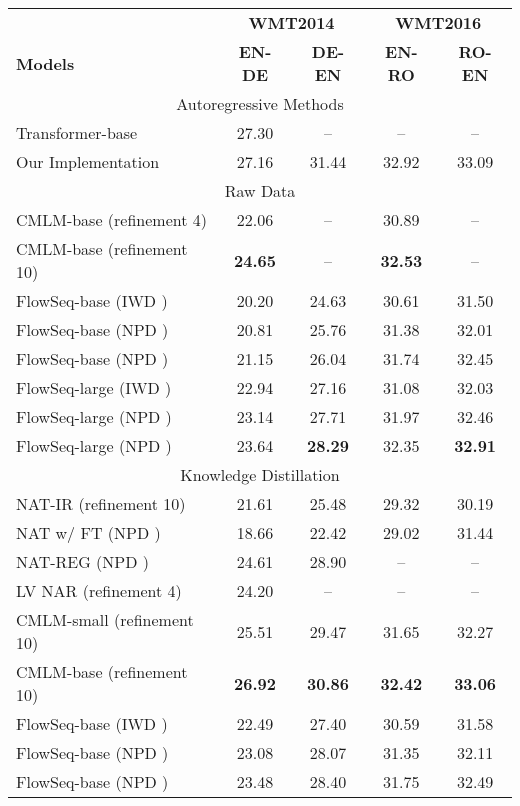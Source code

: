\documentclass[11pt,a4paper]{article}
\begin{document}
\begin{table}[t]
\centering
\resizebox{1.0\columnwidth}{!}
{\begin{tabular}{lcccc}
\toprule
 & \multicolumn{2}{c}{\textbf{WMT2014}} & \multicolumn{2}{c}{\textbf{WMT2016}} \\
\textbf{ Models} & \textbf{EN-DE} & \textbf{DE-EN} & \textbf{EN-RO} & \textbf{RO-EN} \\
\midrule\midrule
\multicolumn{5}{c}{Autoregressive Methods} \\
\midrule
Transformer-base & 27.30 &  -- &  -- & -- \\
Our Implementation & 27.16 & 31.44 & 32.92 & 33.09 \\
\midrule\midrule
\multicolumn{5}{c}{Raw Data} \\
\midrule
CMLM-base (refinement 4) & 22.06 & -- & 30.89 & -- \\
CMLM-base (refinement 10) & \textbf{24.65} & -- & \textbf{32.53} & -- \\
\midrule
FlowSeq-base (IWD ) & 20.20 & 24.63 & 30.61 & 31.50 \\
FlowSeq-base (NPD ) & 20.81 & 25.76 & 31.38 & 32.01 \\
FlowSeq-base (NPD ) & 21.15 & 26.04 & 31.74 & 32.45 \\
\hdashline
FlowSeq-large (IWD ) & 22.94 & 27.16 & 31.08 & 32.03 \\
FlowSeq-large (NPD ) & 23.14 & 27.71 & 31.97 & 32.46 \\
FlowSeq-large (NPD ) & 23.64 & \textbf{28.29} & 32.35 & \textbf{32.91} \\
\midrule\midrule
\multicolumn{5}{c}{Knowledge Distillation} \\ 
\midrule
NAT-IR (refinement 10) & 21.61 &  25.48 & 29.32 & 30.19 \\
NAT w/ FT (NPD ) & 18.66 & 22.42 & 29.02 & 31.44 \\
NAT-REG (NPD ) & 24.61 & 28.90 & -- & -- \\
LV NAR (refinement 4) & 24.20 & -- & -- & -- \\
CMLM-small (refinement 10) & 25.51 & 29.47 & 31.65 & 32.27 \\
CMLM-base (refinement 10) & \textbf{26.92} & \textbf{30.86} & \textbf{32.42} & \textbf{33.06} \\
\midrule
FlowSeq-base (IWD ) & 22.49 & 27.40 & 30.59 & 31.58 \\
FlowSeq-base (NPD ) & 23.08 & 28.07 & 31.35 & 32.11 \\
FlowSeq-base (NPD ) & 23.48 & 28.40 & 31.75 & 32.49 \\

\end{tabular}}
\end{table}
\end{document}
